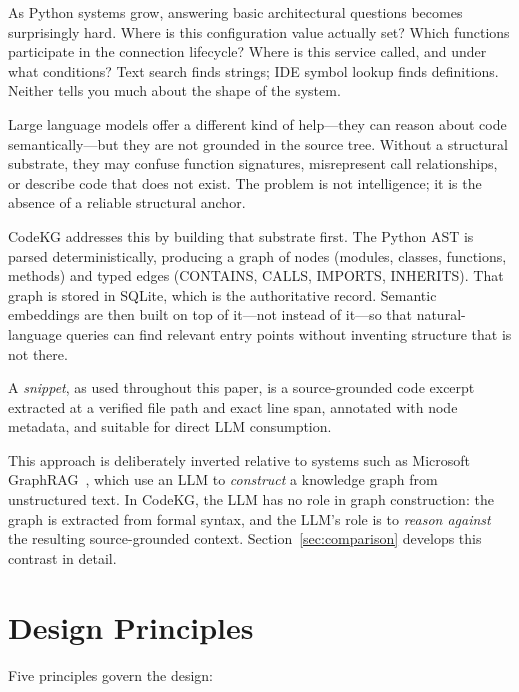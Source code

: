 \documentclass[10pt]{article}
\begin{document}
As Python systems grow, answering basic architectural questions becomes surprisingly
hard. Where is this configuration value actually set? Which functions participate in
the connection lifecycle? Where is this service called, and under what conditions?
Text search finds strings; IDE symbol lookup finds definitions. Neither tells you
much about the shape of the system.

Large language models offer a different kind of help---they can reason about code
semantically---but they are not grounded in the source tree. Without a structural
substrate, they may confuse function signatures, misrepresent call relationships,
or describe code that does not exist. The problem is not intelligence; it is the
absence of a reliable structural anchor.

CodeKG addresses this by building that substrate first. The Python AST is parsed
deterministically, producing a graph of nodes (modules, classes, functions, methods)
and typed edges (CONTAINS, CALLS, IMPORTS, INHERITS). That graph is stored in
SQLite, which is the authoritative record. Semantic embeddings are then built on top
of it---not instead of it---so that natural-language queries can find relevant
entry points without inventing structure that is not there.

A \emph{snippet}, as used throughout this paper, is a source-grounded code excerpt
extracted at a verified file path and exact line span, annotated with node metadata,
and suitable for direct LLM consumption.

This approach is deliberately inverted relative to systems such as Microsoft
GraphRAG~\cite{edge2024graphrag}, which use an LLM to \emph{construct} a knowledge
graph from unstructured text. In CodeKG, the LLM has no role in graph construction:
the graph is extracted from formal syntax, and the LLM's role is to \emph{reason
against} the resulting source-grounded context. Section~\ref{sec:comparison} develops
this contrast in detail.

\section{Design Principles}

Five principles govern the design:
\end{document}
